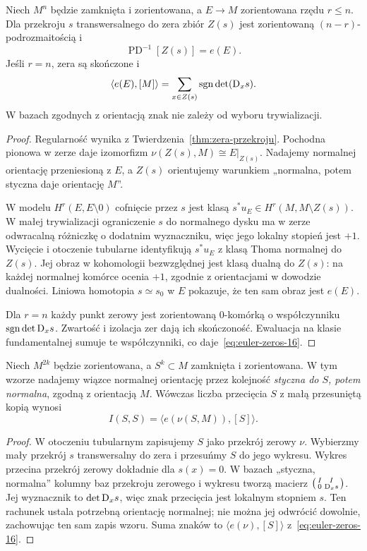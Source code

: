 \begin{twierdzenie}
\label{thm:euler-zeros-16}
Niech $M^n$ będzie
zamknięta i zorientowana,
a $E\to M$ zorientowana
rzędu $r\leq n$.
Dla przekroju $s$
transwersalnego do zera
zbiór $Z(s)$ jest
zorientowaną
$(n-r)$-podrozmaitością i
\[
 \operatorname{PD}^{-1}[Z(s)]=e(E).
\]
Jeśli $r=n$, zera są
skończone i
\begin{equation}\label{eq:euler-zeros-16}
 \langle e(E),[M]\rangle
   =\sum_{x\in Z(s)}
       \operatorname{sgn}\det(\mathrm D_xs).
\end{equation}
W bazach zgodnych z
orientacją znak nie
zależy od wyboru
trywializacji.
\end{twierdzenie}
\begin{proof}
Regularność wynika z Twierdzenia~\ref{thm:zera-przekroju}.
Pochodna pionowa w zerze daje izomorfizm
$\nu(Z(s),M)\cong E|_{Z(s)}$. Nadajemy normalnej
orientację przeniesioną z $E$, a $Z(s)$ orientujemy
warunkiem „normalna, potem styczna daje orientację $M$”.

W modelu $H^r(E,E\setminus0)$ cofnięcie przez $s$
jest klasą $s^*u_E\in H^r(M,M\setminus Z(s))$.
W małej trywializacji ograniczenie $s$ do normalnego
dysku ma w zerze odwracalną różniczkę o dodatnim
wyznaczniku, więc jego lokalny stopień jest $+1$.
Wycięcie i otoczenie tubularne identyfikują
$s^*u_E$ z klasą Thoma normalnej do $Z(s)$.
Jej obraz w kohomologii bezwzględnej jest klasą
dualną do $Z(s)$: na każdej normalnej komórce
ocenia $+1$, zgodnie z orientacjami w dowodzie dualności.
Liniowa homotopia $s\simeq s_0$ w $E$ pokazuje,
że ten sam obraz jest $e(E)$.

Dla $r=n$ każdy punkt zerowy jest zorientowaną
$0$-komórką o współczynniku
$\operatorname{sgn}\det\mathrm D_xs$. Zwartość i izolacja
zer dają ich skończoność. Ewaluacja na klasie
fundamentalnej sumuje te współczynniki,
co daje~\eqref{eq:euler-zeros-16}.
\end{proof}

\begin{wniosek}[Samoprzecięcie]
\label{cor:samoprzeciecie-16}
Niech $M^{2k}$ będzie zorientowana, a
$S^k\subset M$ zamknięta i zorientowana.
W tym wzorze nadajemy wiązce normalnej orientację
przez kolejność \emph{styczna do $S$, potem normalna},
zgodną z orientacją $M$. Wówczas
liczba przecięcia
$S$ z małą przesuniętą
kopią wynosi
\[
 I(S,S)=\langle e(\nu(S,M)),[S]\rangle.
\]
\end{wniosek}
\begin{proof}
W otoczeniu tubularnym
zapisujemy $S$ jako
przekrój zerowy $\nu$.
Wybierzmy mały przekrój
$s$ transwersalny do
zera i przesuńmy $S$
do jego wykresu.
Wykres przecina
przekrój zerowy
dokładnie dla $s(x)=0$.
W bazach „styczna, normalna” kolumny baz
przekroju zerowego i wykresu tworzą macierz
$\begin{psmallmatrix}I&I\\0&\mathrm D_xs\end{psmallmatrix}$.
Jej wyznacznik to $\det\mathrm D_xs$, więc znak przecięcia
jest lokalnym stopniem $s$. Ten rachunek ustala
potrzebną orientację normalnej; nie można jej
odwrócić dowolnie, zachowując ten sam zapis wzoru.
Suma znaków to
$\langle e(\nu),[S]\rangle$
z~\eqref{eq:euler-zeros-16}.
\end{proof}

